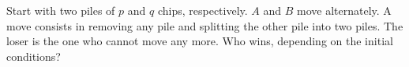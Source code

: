 Start with two piles of $p$ and $q$ chips, respectively. $A$ and $B$ move alternately. A move consists in removing any pile and splitting the other pile into two piles. The loser is the one who cannot move any more. Who wins, depending on the initial conditions?
